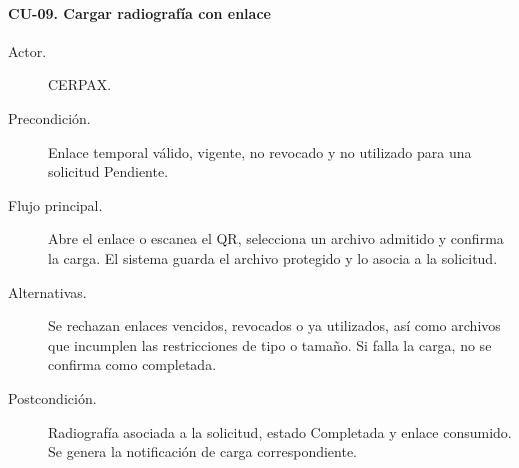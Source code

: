 \paragraph{CU-09. Cargar radiografía con enlace}
\begin{description}

\item[Actor.] CERPAX.
\item[Precondición.] Enlace temporal válido, vigente, no revocado y no utilizado para una solicitud Pendiente.
\item[Flujo principal.] Abre el enlace o escanea el QR, selecciona un archivo admitido y confirma la carga. El sistema guarda el archivo protegido y lo asocia a la solicitud.
\item[Alternativas.] Se rechazan enlaces vencidos, revocados o ya utilizados, así como archivos que incumplen las restricciones de tipo o tamaño. Si falla la carga, no se confirma como completada.
\item[Postcondición.] Radiografía asociada a la solicitud, estado Completada y enlace consumido. Se genera la notificación de carga correspondiente.
\end{description}
